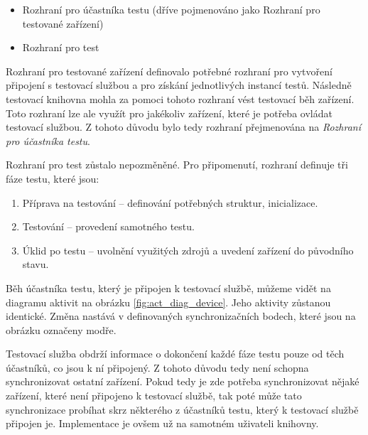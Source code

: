\begin{itemize}
    \item Rozhraní pro účastníka testu (dříve pojmenováno jako Rozhraní pro testované zařízení)
    \item Rozhraní pro test 
\end{itemize}

Rozhraní pro testované zařízení definovalo potřebné rozhraní pro vytvoření připojení s testovací službou a pro získání jednotlivých instancí testů. Následně testovací knihovna mohla za pomoci tohoto rozhraní vést testovací běh zařízení. Toto rozhraní lze ale využít pro jakékoliv zařízení, které je potřeba ovládat testovací službou. Z tohoto důvodu bylo tedy rozhraní přejmenována na \textit{Rozhraní pro účastníka testu}. 

Rozhraní pro test zůstalo nepozměněné. Pro připomenutí, rozhraní definuje tři fáze testu, které jsou:

\begin{enumerate}
    \item Příprava na testování -- definování potřebných struktur, inicializace.
    \item Testování -- provedení samotného testu.
    \item Úklid po testu -- uvolnění využitých zdrojů a uvedení zařízení do původního stavu.
\end{enumerate}

Běh účastníka testu, který je připojen k testovací službě, můžeme vidět na diagramu aktivit na obrázku \ref{fig:act_diag_device}. Jeho aktivity zůstanou identické. Změna nastává v definovaných synchronizačních bodech, které jsou na obrázku označeny modře. 

Testovací služba obdrží informace o dokončení každé fáze testu pouze od těch účastníků, co jsou k ní připojený. Z tohoto důvodu tedy není schopna synchronizovat ostatní zařízení. Pokud tedy je zde potřeba synchronizovat nějaké zařízení, které není připojeno k testovací službě, tak poté může tato synchronizace probíhat skrz některého z účastníků testu, který k testovací službě připojen je. Implementace je ovšem už na samotném uživateli knihovny.

